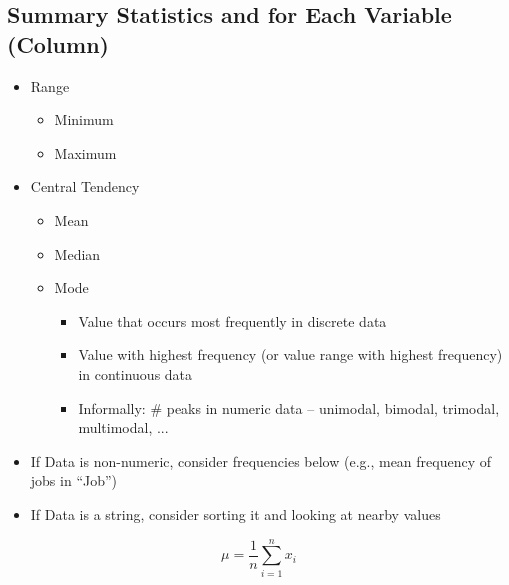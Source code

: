 \documentclass[11pt]{article}
\theoremstyle{definition}
\begin{document}
\subsection{Summary Statistics and for Each Variable (Column)}
\begin{itemize}
    \item Range
    \begin{itemize}
        \item Minimum
        \item Maximum
    \end{itemize}
    \item Central Tendency
    \begin{itemize}
        \item Mean
        \item Median
        \item Mode
        \begin{itemize}
            \item Value that occurs most frequently in discrete data
            \item Value with highest frequency (or value range with highest frequency) in continuous data
            \item Informally: \# peaks in numeric data – unimodal, bimodal, trimodal, multimodal, ...
        \end{itemize}
    \end{itemize}
    \item If Data is non-numeric, consider frequencies below (e.g., mean frequency of jobs in “Job”)
    \item If Data is a string, consider sorting it and looking at nearby values
\end{itemize}
\begin{equation}
    \mu = \frac{1}{n}\sum_{i=1}^{n}x_i
\end{equation}
\end{document}
